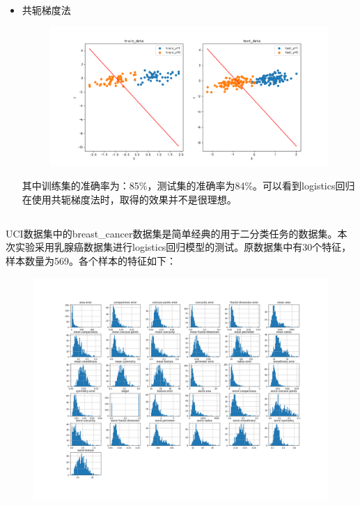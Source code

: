 \documentclass[lang=cn,a4paper,cite=authoryear]{elegantpaper}
\begin{document}
\begin{itemize}
	\par
	\item 共轭梯度法
	\begin{center}
		\begin{figure}[H]
			\centering
			\includegraphics[scale=0.5]{gctest04}
		\end{figure}
	\end{center}
	其中训练集的准确率为：85\%，测试集的准确率为84\%。可以看到logistics回归在使用共轭梯度法时，取得的效果并不是很理想。
\end{itemize}
\subsection*{}
UCI数据集中的breast\_cancer数据集是简单经典的用于二分类任务的数据集。本次实验采用乳腺癌数据集进行logistics回归模型的测试。原数据集中有30个特征，样本数量为569。各个样本的特征如下：
\begin{center}
	\begin{figure}[H]
		\centering
		\includegraphics[scale=0.3]{fecter_analisy}
		\centering
	\end{figure}
\end{center}
\end{document}
